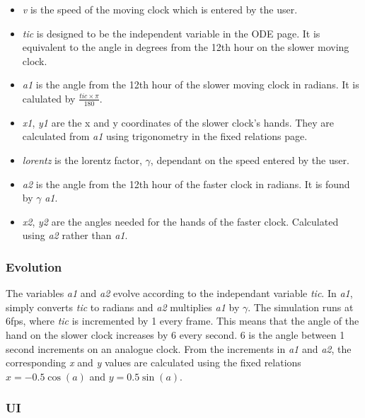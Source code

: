 \documentclass[11pt]{article}
\begin{document}
\begin{itemize}
\item \emph{v} is the speed of the moving clock which is entered by the user.
\item \emph{tic} is designed to be the independent variable in the ODE page. It is equivalent to the angle in degrees from the 12th hour on the slower moving clock.
\item \emph{a1} is the angle from the 12th hour of the slower moving clock in radians. It is calulated by $\frac{tic \times \pi}{180}$.
\item \emph{x1}, \emph{y1} are the x and y coordinates of the slower clock's hands. They are calculated from \emph{a1} using trigonometry in the fixed relations page.
\item \emph{lorentz} is the lorentz factor, $\gamma$, dependant on the speed entered by the user.
\item \emph{a2} is the angle from the 12th hour of the faster clock in radians. It is found by $\gamma$ \texttimes{} \emph{a1}.
\item \emph{x2}, \emph{y2} are the angles needed for the hands of the faster clock. Calculated using \emph{a2} rather than \emph{a1}.
\end{itemize}
\subsubsection*{Evolution}
\label{sec-2-2-2}

The variables \emph{a1} and \emph{a2} evolve according to the independant variable \emph{tic}. In \emph{a1}, simply converts \emph{tic} to radians and \emph{a2} multiplies \emph{a1} by $\gamma$.
The simulation runs at 6fps, where \emph{tic} is incremented by 1 every frame. This means that the angle of the hand on the slower clock increases by 6\textdegree{} every second. 6\textdegree{} is the angle between 1 second increments on an analogue clock.
From the increments in \emph{a1} and \emph{a2}, the corresponding \emph{x} and \emph{y} values are calculated using the fixed relations $x = -0.5\cos(a)$ and $y = 0.5\sin(a)$.
\subsubsection*{UI}
\label{sec-2-2-3}
\end{document}
